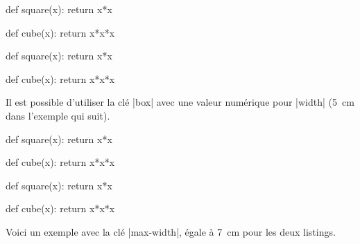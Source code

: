\documentclass[dvipsnames,svgnames]{article}
\begin{document}
\smallskip
\begin{Code}
\begin{center}
\begin{Piton}
def square(x):
    return x*x
\end{Piton}
\hspace{1cm}
\begin{Piton}
def cube(x):
    return x*x*x
\end{Piton}
\end{center}
\end{Code}

\begin{center}
\begin{Piton}
def square(x):
    return x*x
\end{Piton}
\hspace{1cm}
\begin{Piton}
def cube(x):
    return x*x*x
\end{Piton}
\end{center}

\vspace{1cm} Il est possible d'utiliser la clé |box| avec une valeur numérique pour |width|
(5~cm dans l'exemple qui suit).

\begin{Code}
\begin{center}
\begin{Piton}
def square(x):
    return x*x
\end{Piton}
\hspace{1cm}
\begin{Piton}
def cube(x):
    return x*x*x
\end{Piton}
\end{center}
\end{Code}

\begin{center}
\begin{Piton}
def square(x):
    return x*x
\end{Piton}
\hspace{1cm}
\begin{Piton}
def cube(x):
    return x*x*x
\end{Piton}
\end{center}


\vspace{1cm}
Voici un exemple avec la clé |max-width|, égale à 7~cm pour les deux listings.
\end{document}
